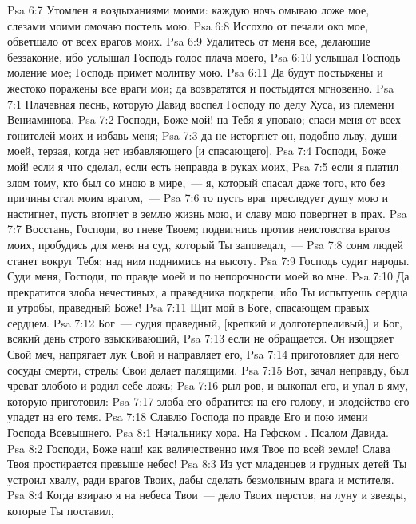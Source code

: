 \vs Psa 6:7 Утомлен я воздыханиями моими: каждую ночь омываю ложе мое, слезами моими омочаю постель мою.
\vs Psa 6:8 Иссохло от печали око мое, обветшало от всех врагов моих.
\vs Psa 6:9 Удалитесь от меня все, делающие беззаконие, ибо услышал Господь голос плача моего,
\vs Psa 6:10 услышал Господь моление мое; Господь примет молитву мою.
\vs Psa 6:11 Да будут постыжены и жестоко поражены все враги мои; да возвратятся и постыдятся мгновенно.
\vs Psa 7:1 Плачевная песнь, которую Давид воспел Господу по делу Хуса, из племени Вениаминова.
\rsbpar\vs Psa 7:2 Господи, Боже мой! на Тебя я уповаю; спаси меня от всех гонителей моих и избавь меня;
\vs Psa 7:3 да не исторгнет он, подобно льву, души моей, терзая, когда нет избавляющего [и спасающего].
\vs Psa 7:4 Господи, Боже мой! если я что сделал, если есть неправда в руках моих,
\vs Psa 7:5 если я платил злом тому, кто был со мною в мире,~--- я, который спасал даже того, кто без причины стал моим врагом,~---
\vs Psa 7:6 то пусть враг преследует душу мою и настигнет, пусть втопчет в землю жизнь мою, и славу мою повергнет в прах.
\vs Psa 7:7 Восстань, Господи, во гневе Твоем; подвигнись против неистовства врагов моих, пробудись для меня на суд, который Ты заповедал,~---
\vs Psa 7:8 сонм людей станет вокруг Тебя; над ним поднимись на высоту.
\vs Psa 7:9 Господь судит народы. Суди меня, Господи, по правде моей и по непорочности моей во мне.
\vs Psa 7:10 Да прекратится злоба нечестивых, а праведника подкрепи, ибо Ты испытуешь сердца и утробы, праведный Боже!
\vs Psa 7:11 Щит мой в Боге, спасающем правых сердцем.
\vs Psa 7:12 Бог~--- судия праведный, [крепкий и долготерпеливый,] и Бог, всякий день строго взыскивающий,
\vs Psa 7:13 если  не обращается. Он изощряет Свой меч, напрягает лук Свой и направляет его,
\vs Psa 7:14 приготовляет для него сосуды смерти, стрелы Свои делает палящими.
\vs Psa 7:15 Вот,  зачал неправду, был чреват злобою и родил себе ложь;
\vs Psa 7:16 рыл ров, и выкопал его, и упал в яму, которую приготовил:
\vs Psa 7:17 злоба его обратится на его голову, и злодейство его упадет на его темя.
\vs Psa 7:18 Славлю Господа по правде Его и пою имени Господа Всевышнего.
\vs Psa 8:1 Начальнику хора. На Гефском . Псалом Давида.
\rsbpar\vs Psa 8:2 Господи, Боже наш! как величественно имя Твое по всей земле! Слава Твоя простирается превыше небес!
\vs Psa 8:3 Из уст младенцев и грудных детей Ты устроил хвалу, ради врагов Твоих, дабы сделать безмолвным врага и мстителя.
\vs Psa 8:4 Когда взираю я на небеса Твои~--- дело Твоих перстов, на луну и звезды, которые Ты поставил,
